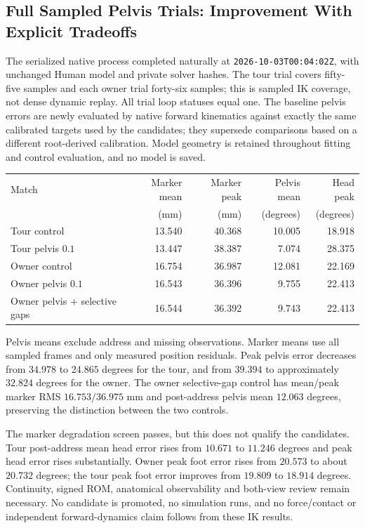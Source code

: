 \documentclass[11pt,a4paper]{article}
\begin{document}
\subsection{Full Sampled Pelvis Trials: Improvement With Explicit Tradeoffs}
The serialized native process completed naturally at
\texttt{2026-10-03T00:04:02Z}, with unchanged Human model and private solver
hashes. The tour trial covers fifty-five samples and each owner trial
forty-six samples; this is sampled IK coverage, not dense dynamic replay.
All trial loop statuses equal one. The baseline pelvis errors are newly
evaluated by native forward kinematics against exactly the same calibrated
targets used by the candidates; they supersede comparisons based on a
different root-derived calibration. Model geometry is retained throughout
fitting and control evaluation, and no model is saved.

\begin{center}
\begin{tabularx}{\textwidth}{lrrrr}
\toprule
Match & Marker mean & Marker peak & Pelvis mean & Head peak \\
 & (mm) & (mm) & (degrees) & (degrees) \\
\midrule
Tour control & 13.540 & 40.368 & 10.005 & 18.918 \\
Tour pelvis $0.1$ & 13.447 & 38.387 & 7.074 & 28.375 \\
Owner control & 16.754 & 36.987 & 12.081 & 22.169 \\
Owner pelvis $0.1$ & 16.543 & 36.396 & 9.755 & 22.413 \\
Owner pelvis + selective gaps & 16.544 & 36.392 & 9.743 & 22.413 \\
\bottomrule
\end{tabularx}
\end{center}
Pelvis means exclude address and missing observations. Marker means use
all sampled frames and only measured position residuals. Peak pelvis
error decreases from $34.978$ to $24.865$ degrees for the tour, and from
$39.394$ to approximately $32.824$ degrees for the owner. The owner
selective-gap control has mean/peak marker RMS $16.753/36.975$ mm and
post-address pelvis mean $12.063$ degrees, preserving the distinction
between the two controls.

The marker degradation screen passes, but this does not qualify the
candidates. Tour post-address mean head error rises from $10.671$ to
$11.246$ degrees and peak head error rises substantially. Owner peak foot
error rises from $20.573$ to about $20.732$ degrees; the tour peak foot
error improves from $19.809$ to $18.914$ degrees. Continuity, signed ROM,
anatomical observability and both-view review remain necessary. No
candidate is promoted, no simulation runs, and no force/contact or
independent forward-dynamics claim follows from these IK results.
\end{document}
